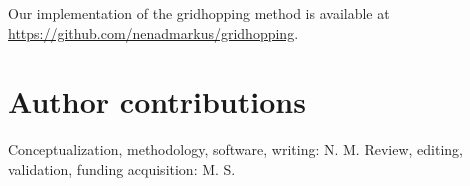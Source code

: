 \documentclass[11pt,twocolumn]{article}
\begin{document}
		Our implementation of the gridhopping method is available at \url{https://github.com/nenadmarkus/gridhopping}.

    \section{Author contributions}
        Conceptualization, methodology, software, writing: N. M. Review, editing, validation, funding acquisition: M. S.  

	
	
\end{document}
